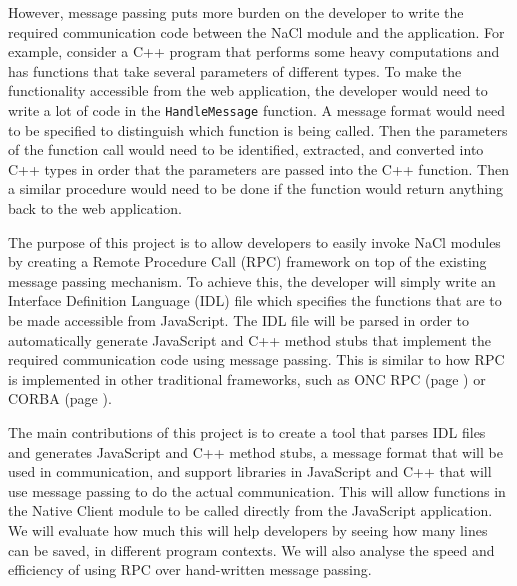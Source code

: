 However, message passing puts more burden on the developer to write the required communication code between the NaCl module and the application. For example, consider a C++ program that performs some heavy computations and has functions that take several parameters of different types. To make the functionality accessible from the web application, the developer would need to write a lot of code in the \lstinline+HandleMessage+ function. A message format would need to be specified to distinguish which function is being called. Then the parameters of the function call would need to be identified, extracted, and converted into C++ types in order that the parameters are passed into the C++ function. Then a similar procedure would need to be done if the function would return anything back to the web application. 

The purpose of this project is to allow developers to easily invoke NaCl modules by creating a Remote Procedure Call (RPC) framework on top of the existing message passing mechanism. To achieve this, the developer will simply write an Interface Definition Language (IDL) file which specifies the functions that are to be made accessible from JavaScript. The IDL file will be parsed in order to automatically generate JavaScript and C++ method stubs that implement the required communication code using message passing. This is similar to how RPC is implemented in other traditional frameworks, such as ONC RPC (page \pageref{sub:oncrpc_intro}) or CORBA (page \pageref{sub:corba_intro}).

The main contributions of this project is to create a tool that parses IDL files and generates JavaScript and C++ method stubs, a message format that will be used in communication, and support libraries in JavaScript and C++ that will use message passing to do the actual communication. This will allow functions in the Native Client module to be called directly from the JavaScript application. We will evaluate how much this will help developers by seeing how many lines can be saved, in different program contexts. We will also analyse the speed and efficiency of using RPC over hand-written message passing. 
